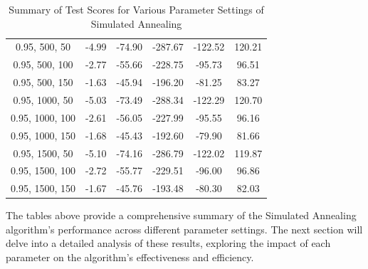 \documentclass[
]{article}
\begin{document}
\begin{table}[H]
{\begin{tabular}{|c|c|c|c|c|c|}
                0.95, 500, 50              & -4.99                      & -74.90                     & -287.67                    & -122.52                  & 120.21                  \\
                0.95, 500, 100             & -2.77                      & -55.66                     & -228.75                    & -95.73                   & 96.51                   \\
                0.95, 500, 150             & -1.63                      & -45.94                     & -196.20                    & -81.25                   & 83.27                   \\
                0.95, 1000, 50             & -5.03                      & -73.49                     & -288.34                    & -122.29                  & 120.70                  \\
                0.95, 1000, 100            & -2.61                      & -56.05                     & -227.99                    & -95.55                   & 96.16                   \\
                0.95, 1000, 150            & -1.68                      & -45.43                     & -192.60                    & -79.90                   & 81.66                   \\
                0.95, 1500, 50             & -5.10                      & -74.16                     & -286.79                    & -122.02                  & 119.87                  \\
                0.95, 1500, 100            & -2.72                      & -55.77                     & -229.51                    & -96.00                   & 96.86                   \\
                0.95, 1500, 150            & -1.67                      & -45.76                     & -193.48                    & -80.30                   & 82.03                   \\
                \hline
            \end{tabular}
        }
        \caption{Summary of Test Scores for Various Parameter Settings of Simulated Annealing}
        \label{tab:sa_summary_test_scores}
    \end{table}

    The tables above provide a comprehensive summary of the Simulated Annealing algorithm's performance across different parameter settings. The next section will delve into a detailed analysis of these results, exploring the impact of each parameter on the algorithm's effectiveness and efficiency.
\end{document}
